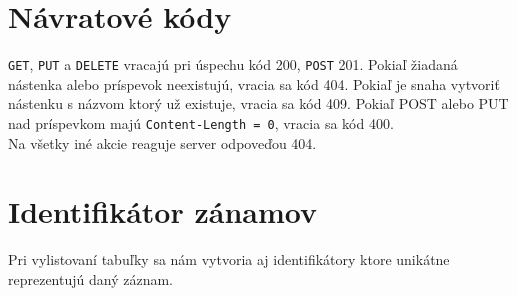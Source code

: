 \documentclass[a4paper,12pt,oneside]{article}
\theoremstyle{definition}
\theoremstyle{definition}
\theoremstyle{definition}
\begin{document}
\section{Návratové kódy}
\texttt{GET}, \texttt{PUT} a \texttt{DELETE} vracajú pri úspechu kód 200, \texttt{POST} 201. Pokiaľ žiadaná nástenka alebo príspevok neexistujú, vracia sa kód 404. Pokiaľ je snaha vytvoriť nástenku s názvom ktorý už existuje, vracia sa kód 409. Pokiaľ POST alebo PUT nad príspevkom majú \texttt{Content-Length = 0}, vracia sa kód 400. \\
Na všetky iné akcie reaguje server odpoveďou 404. 

\section{Identifikátor zánamov}
Pri vylistovaní tabuľky sa nám vytvoria aj identifikátory ktore unikátne reprezentujú daný záznam.
\end{document}
